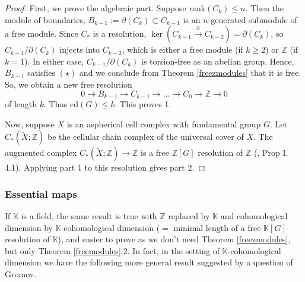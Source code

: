 \documentclass[11pt,letterpaper]{amsart}
\begin{document}
\begin{proof}
First, we prove the algebraic part. %
Suppose rank$(C_k)\leqslant n$. Then the module of boundaries, $B_{k-1}:= \partial (C_k)\subset C_{k - 1}$ is an $n$-generated submodule of a free module. %
Since $C_{\ast}$ is a resolution, $\ker \left( C_{k - 1}
  \overset{\partial}{\rightarrow} C_{k - 2} \right) = \partial (C_k)$, so $C_{k - 1} / \partial (C_k)$ injects into $C_{k - 2}$, which is either a free module (if $k \geq 2$) or $\mathbb{Z}$ (if $k = 1$). In either case, $C_{k - 1} / \partial (C_k)$ is torsion-free as an abelian group. Hence, $B_{k-1}$ satisfies $(\star)$ and we conclude from Theorem \ref{freezmodules} that it is free. So, we obtain a new free resolution 
$$
0 \rightarrow B_{k-1} \rightarrow C_{k - 1}\rightarrow \ldots \rightarrow C_0 \rightarrow \mathbb{Z} \rightarrow 0 
$$
of length $k$. Thus $\mathrm{cd} (G) \leq k$. This proves 1.

Now, suppose $X$ is an aspherical cell complex with fundamental group $G$. Let $C_* (\widetilde{X} ; \mathbb{Z})$ be the cellular chain complex of the universal cover of $X$. The augmented complex $C_*(\widetilde X;\mathbb Z)\rightarrow \mathbb{Z}$ is a free $\mathbb{Z} [G]$ resolution of $\mathbb{Z}$ (\cite{brownbook}, Prop I. 4.1). Applying part 1 to this resolution gives part 2.
\end{proof}



\subsubsection*{Essential maps}
If $\mathbb{K}$ is a field, the same result is true with $\mathbb Z$ replaced by $\mathbb K$ and cohomological dimension by $\mathbb K$-cohomological dimension ($=$ minimal length of a free $\mathbb K[G]$-resolution of $\mathbb K$), and easier to prove as we don't need Theorem \ref{freezmodules}, but only Theorem \ref{freemodules}.2. In fact, in the setting of $\mathbb K$-cohomological dimension we have the following more general result suggested by a question of Gromov. 
\end{document}
